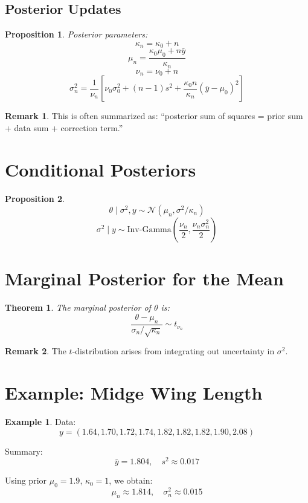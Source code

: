 \documentclass[12pt,oneside]{book}
\numberwithin{equation}{section}
\theoremstyle{definition}
\newtheorem{example}{Example}[section]
\newtheorem{remark}{Remark}[section]
\theoremstyle{plain}
\newtheorem{theorem}{Theorem}[section]
\newtheorem{proposition}{Proposition}[section]
\theoremstyle{remark}
\newcommand{\Normal}{\mathcal{N}}
\newcommand{\InvGam}{\mathrm{Inv\text{-}Gamma}}
\begin{document}
\subsection{Posterior Updates}

\begin{proposition}
Posterior parameters:
$$
\kappa_n = \kappa_0 + n
$$
$$
\mu_n =
\frac{\kappa_0 \mu_0 + n\bar{y}}{\kappa_n}
$$
$$
\nu_n = \nu_0 + n
$$
$$
\sigma_n^2 =
\frac{1}{\nu_n}
\left[
\nu_0\sigma_0^2
+
(n-1)s^2
+
\frac{\kappa_0 n}{\kappa_n}(\bar{y} - \mu_0)^2
\right]
$$
\end{proposition}

\begin{remark}
This is often summarized as:
``posterior sum of squares = prior sum + data sum + correction term.''
\end{remark}

\section{Conditional Posteriors}

\begin{proposition}
$$
\theta \mid \sigma^2, y \sim \Normal(\mu_n, \sigma^2/\kappa_n)
$$
$$
\sigma^2 \mid y \sim \InvGam\left(\frac{\nu_n}{2}, \frac{\nu_n\sigma_n^2}{2}\right)
$$
\end{proposition}

\section{Marginal Posterior for the Mean}

\begin{theorem}
The marginal posterior of $\theta$ is:
$$
\frac{\theta - \mu_n}{\sigma_n / \sqrt{\kappa_n}}
\sim t_{\nu_n}
$$
\end{theorem}

\begin{remark}
The $t$-distribution arises from integrating out uncertainty in $\sigma^2$.
\end{remark}

\section{Example: Midge Wing Length}

\begin{example}
Data:
$$
y = (1.64, 1.70, 1.72, 1.74, 1.82, 1.82, 1.82, 1.90, 2.08)
$$

Summary:
$$
\bar{y} = 1.804, \quad s^2 \approx 0.017
$$

Using prior $\mu_0 = 1.9$, $\kappa_0 = 1$, we obtain:
$$
\mu_n \approx 1.814, \quad \sigma_n^2 \approx 0.015
$$
\end{example}
\end{document}

